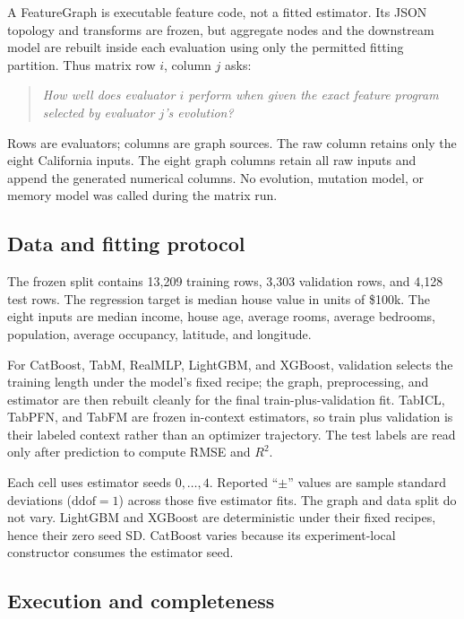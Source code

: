 \documentclass[10pt]{article}
\begin{document}
A FeatureGraph is executable feature code, not a fitted estimator.  Its JSON
topology and transforms are frozen, but aggregate nodes and the downstream
model are rebuilt inside each evaluation using only the permitted fitting
partition.  Thus matrix row \(i\), column \(j\) asks:

\begin{quote}
\emph{How well does evaluator \(i\) perform when given the exact feature
program selected by evaluator \(j\)'s evolution?}
\end{quote}

Rows are evaluators; columns are graph sources.  The raw column retains only
the eight California inputs.  The eight graph columns retain all raw inputs
and append the generated numerical columns.  No evolution, mutation model, or
memory model was called during the matrix run.

\subsection{Data and fitting protocol}

The frozen split contains 13,209 training rows, 3,303 validation rows, and
4,128 test rows.  The regression target is median house value in units of
\$100k.  The eight inputs are median income, house age, average rooms,
average bedrooms, population, average occupancy, latitude, and longitude.

For CatBoost, TabM, RealMLP, LightGBM, and XGBoost, validation selects the
training length under the model's fixed recipe; the graph, preprocessing, and
estimator are then rebuilt cleanly for the final train-plus-validation fit.
TabICL, TabPFN, and TabFM are frozen in-context estimators, so train plus
validation is their labeled context rather than an optimizer trajectory.  The
test labels are read only after prediction to compute RMSE and \(R^2\).

Each cell uses estimator seeds \(0,\ldots,4\).  Reported ``\(\pm\)'' values
are sample standard deviations (\(\mathrm{ddof}=1\)) across those five
estimator fits.  The graph and data split do not vary.  LightGBM and XGBoost
are deterministic under their fixed recipes, hence their zero seed SD.
CatBoost varies because its experiment-local constructor consumes the
estimator seed.

\subsection{Execution and completeness}
\end{document}
